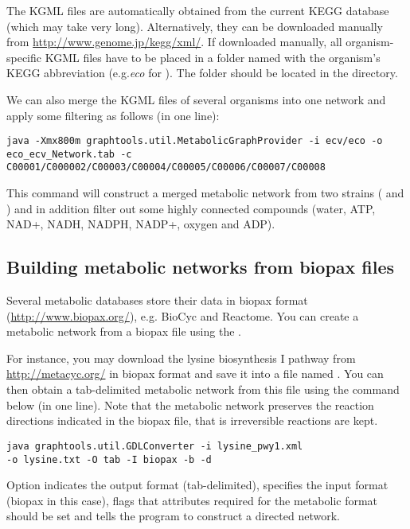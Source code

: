 The KGML files are automatically obtained from the current KEGG database
(which may take very long). Alternatively, they can be downloaded manually from
\url{http://www.genome.jp/kegg/xml/}.
If downloaded manually, all organism-specific KGML files have to be placed in a
folder named with the organism's KEGG abbreviation (e.g.\textit{eco}
for ). The folder should be located in the 
directory.
 
We can also merge the KGML files of several organisms into one network and apply
some filtering as follows (in one line):

\begin{verbatim}
java -Xmx800m graphtools.util.MetabolicGraphProvider -i ecv/eco -o
eco_ecv_Network.tab -c C00001/C000002/C00003/C00004/C00005/C00006/C00007/C00008
\end{verbatim}

This command will construct a merged metabolic network from two
 strains ( and ) 
and in addition filter out some highly connected compounds 
(water, ATP, NAD+, NADH, NADPH, NADP+, oxygen and ADP).

\subsection{Building metabolic networks from biopax files}

Several metabolic databases store their data in biopax format
(\url{http://www.biopax.org/}), e.g. BioCyc and Reactome. You can create
a metabolic network from a biopax file using the
.

For instance, you may download the lysine biosynthesis I pathway from
\url{http://metacyc.org/} in biopax format and save it into a file named
. You can then obtain a tab-delimited metabolic network
from this file using the command below (in one line). Note that the metabolic
network preserves the reaction directions indicated in the biopax file, that is irreversible reactions are
kept.

\begin{verbatim}
java graphtools.util.GDLConverter -i lysine_pwy1.xml 
-o lysine.txt -O tab -I biopax -b -d
\end{verbatim}

Option  indicates the output format (tab-delimited), 
specifies the input format (biopax in this case),  flags that
attributes required for the metabolic format should be set and  tells
the program to construct a directed network.


